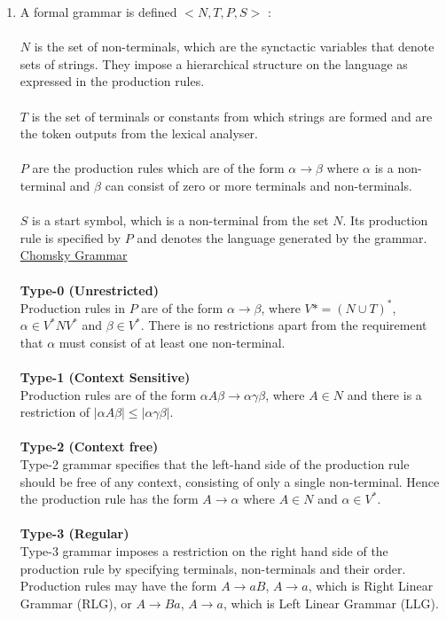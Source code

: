 \documentclass[a4paper, 12pt, oneside]{book}
\begin{document}
\begin{enumerate}
  \item
    A formal grammar is defined $<N,T,P,S>$ : \\
    \\
    $N$ is the set of non-terminals, which are the synctactic variables that denote sets of strings. They impose a hierarchical structure on the language as expressed in the production rules.\\
    \\
    $T$ is the set of terminals or constants from which strings are formed and are the token outputs from the lexical analyser.\\
    \\
    $P$ are the production rules which are of the form $\alpha\rightarrow\beta$ where $\alpha$ is a non-terminal and $\beta$ can consist of zero or more terminals and non-terminals.\\
    \\
    $S$ is a start symbol, which is a non-terminal from the set $N$. Its production rule is specified by $P$ and denotes the language generated by the grammar.\\

    \underline{Chomsky Grammar}\\
    \\
    \textbf{Type-0 (Unrestricted)}\\
    Production rules in $P$ are of the form $\alpha\rightarrow\beta$, where $V* = (N \cup T)^{*}$, $\alpha \in V^{*}NV^{*}$ and $\beta\in V^{*}$. There is no restrictions apart from the requirement that $\alpha$ must consist of at least one non-terminal.\\
    \\
    \textbf{Type-1 (Context Sensitive)}\\
    Production rules are of the form $\alpha A \beta \rightarrow \alpha\gamma\beta$, where $A \in N$ and there is a restriction of $|\alpha A \beta|\le|\alpha\gamma\beta|$.\\
    \\
    \textbf{Type-2 (Context free)}\\
    Type-2 grammar specifies that the left-hand side of the production rule should be free of any context, consisting of only a single non-terminal. Hence the production rule has the form $A\rightarrow\alpha$ where $A\in N$ and $\alpha\in V^{*}$.\\
    \\
    \textbf{Type-3 (Regular)}\\
    Type-3 grammar imposes a restriction on the right hand side of the production rule by specifying terminals, non-terminals and their order. Production rules may have the form $A\rightarrow aB$, $A\rightarrow a$, which is Right Linear Grammar (RLG), or $A\rightarrow Ba$, $A\rightarrow a$, which is Left Linear Grammar (LLG).\\


\end{enumerate}
\end{document}
